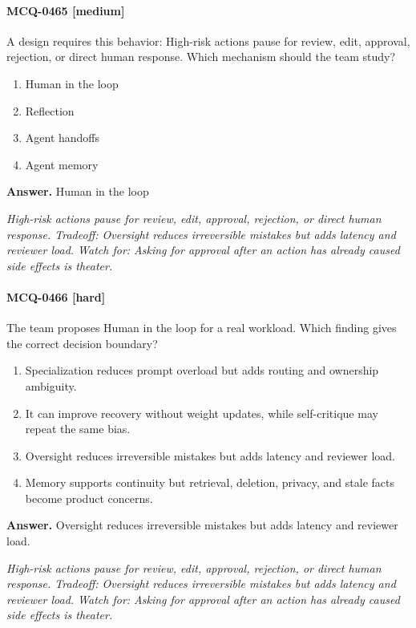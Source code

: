 \paragraph{MCQ-0465 [medium]} A design requires this behavior: High-risk actions pause for review, edit, approval, rejection, or direct human response. Which mechanism should the team study?
\begin{enumerate}[label=\Alph*.]
\item Human in the loop
\item Reflection
\item Agent handoffs
\item Agent memory
\end{enumerate}
\noindent\textbf{Answer.} Human in the loop
\par\textit{High-risk actions pause for review, edit, approval, rejection, or direct human response. Tradeoff: Oversight reduces irreversible mistakes but adds latency and reviewer load. Watch for: Asking for approval after an action has already caused side effects is theater.}
\paragraph{MCQ-0466 [hard]} The team proposes Human in the loop for a real workload. Which finding gives the correct decision boundary?
\begin{enumerate}[label=\Alph*.]
\item Specialization reduces prompt overload but adds routing and ownership ambiguity.
\item It can improve recovery without weight updates, while self-critique may repeat the same bias.
\item Oversight reduces irreversible mistakes but adds latency and reviewer load.
\item Memory supports continuity but retrieval, deletion, privacy, and stale facts become product concerns.
\end{enumerate}
\noindent\textbf{Answer.} Oversight reduces irreversible mistakes but adds latency and reviewer load.
\par\textit{High-risk actions pause for review, edit, approval, rejection, or direct human response. Tradeoff: Oversight reduces irreversible mistakes but adds latency and reviewer load. Watch for: Asking for approval after an action has already caused side effects is theater.}
